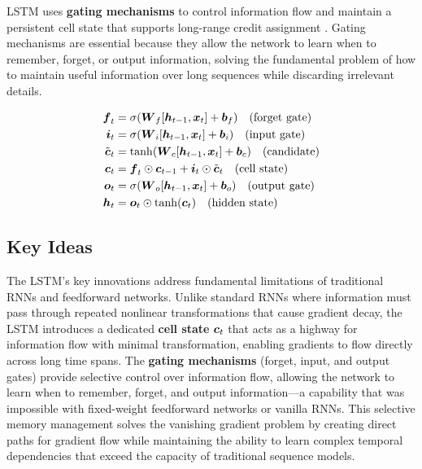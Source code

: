 LSTM uses \textbf{gating mechanisms} to control information flow and maintain a persistent cell state that supports long-range credit assignment \cite{Hochreiter1997,GoodfellowEtAl2016}. Gating mechanisms are essential because they allow the network to learn when to remember, forget, or output information, solving the fundamental problem of how to maintain useful information over long sequences while discarding irrelevant details.

\begin{align}
\boldsymbol{f}_t &= \sigma(\boldsymbol{W}_f [\boldsymbol{h}_{t-1}, \boldsymbol{x}_t] + \boldsymbol{b}_f) \quad \text{(forget gate)} \\
\boldsymbol{i}_t &= \sigma(\boldsymbol{W}_i [\boldsymbol{h}_{t-1}, \boldsymbol{x}_t] + \boldsymbol{b}_i) \quad \text{(input gate)} \\
\tilde{\boldsymbol{c}}_t &= \tanh(\boldsymbol{W}_c [\boldsymbol{h}_{t-1}, \boldsymbol{x}_t] + \boldsymbol{b}_c) \quad \text{(candidate)} \\
\boldsymbol{c}_t &= \boldsymbol{f}_t \odot \boldsymbol{c}_{t-1} + \boldsymbol{i}_t \odot \tilde{\boldsymbol{c}}_t \quad \text{(cell state)} \\
\boldsymbol{o}_t &= \sigma(\boldsymbol{W}_o [\boldsymbol{h}_{t-1}, \boldsymbol{x}_t] + \boldsymbol{b}_o) \quad \text{(output gate)} \\
\boldsymbol{h}_t &= \boldsymbol{o}_t \odot \tanh(\boldsymbol{c}_t) \quad \text{(hidden state)}
\end{align}

\subsection{Key Ideas}

The LSTM's key innovations address fundamental limitations of traditional RNNs and feedforward networks. Unlike standard RNNs where information must pass through repeated nonlinear transformations that cause gradient decay, the LSTM introduces a dedicated \textbf{cell state} $\boldsymbol{c}_t$ that acts as a highway for information flow with minimal transformation, enabling gradients to flow directly across long time spans. The \textbf{gating mechanisms} (forget, input, and output gates) provide selective control over information flow, allowing the network to learn when to remember, forget, and output information—a capability that was impossible with fixed-weight feedforward networks or vanilla RNNs. This selective memory management solves the vanishing gradient problem by creating direct paths for gradient flow while maintaining the ability to learn complex temporal dependencies that exceed the capacity of traditional sequence models.

